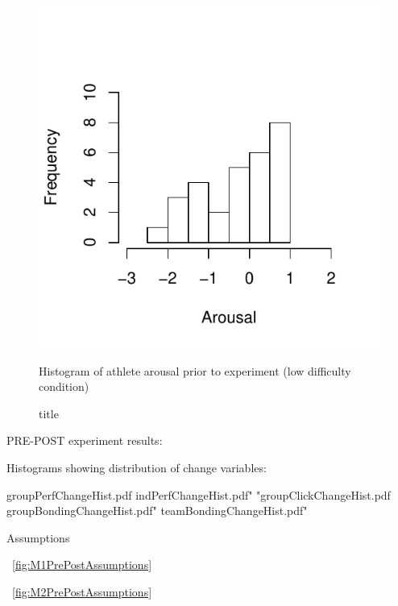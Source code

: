 \begin{figure}
  \centering
  \includegraphics[width=0.5\linewidth,keepaspectratio] {images/histArousalFactorPreLow-1}
      \caption{Histogram of athlete arousal prior to experiment (low difficulty condition)}
  \caption{title}
    \label{fig:histArousalFactorPreLow}
\end{figure}














PRE-POST experiment results:

Histograms showing distribution of change variables:

groupPerfChangeHist.pdf
indPerfChangeHist.pdf"
"groupClickChangeHist.pdf
groupBondingChangeHist.pdf"
teamBondingChangeHist.pdf"



Assumptions

~\ref{fig:M1PrePostAssumptions}


~\ref{fig:M2PrePostAssumptions}
